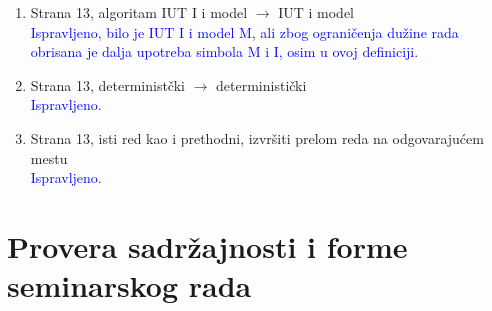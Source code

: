 \documentclass[a4paper]{report}
\newcommand{\odgovor}[1]{\textcolor{blue}{#1}}
\begin{document}
\begin{enumerate}
\item Strana 13, algoritam IUT I i model $\rightarrow$ IUT i model
\\ \odgovor{Ispravljeno, bilo je IUT I i model M, ali zbog ograničenja dužine rada obrisana je dalja upotreba simbola M i I, osim u ovoj definiciji.}

\item Strana 13, deterministčki $\rightarrow$ deterministički
\\ \odgovor{Ispravljeno.}

\item Strana 13, isti red kao i prethodni, izvršiti prelom reda na odgovarajućem mestu
\\ \odgovor{Ispravljeno.}
\end{enumerate}

\section{Provera sadržajnosti i forme seminarskog rada}
\end{document}
